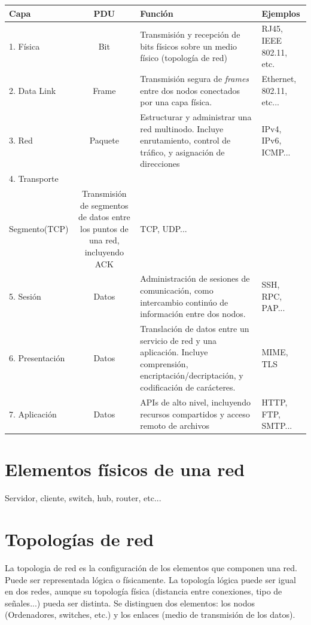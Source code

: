 \documentclass[a4paper, 11pt]{report} %
\begin{document}
\renewcommand{\arraystretch}{1.2}
\noindent
\begin{tabularx}{\columnwidth}{|l c X p{2cm}|}
	\rowcolor{header} \hline
	\textbf{Capa} & \textbf{PDU} & \textbf{Función} & \textbf{Ejemplos} \\ \hline
	1. Física & Bit & Transmisión y recepción de bits físicos sobre un medio físico (topología de red) & 	 RJ45, IEEE 802.11, etc. \\
	\label{osi}
	2. Data Link & Frame & Transmisión segura de \textit{frames} entre dos nodos conectados por una capa física. & Ethernet, 802.11, etc...\\
	3. Red & Paquete & Estructurar y administrar una red multinodo. Incluye enrutamiento, control de tráfico, y asignación de direcciones & IPv4, IPv6, ICMP... \\
	4. Transporte & \begin{tabular}[t]{@{}c@{}}Datagrama(UDP)\\Segmento(TCP)  \end{tabular} &
	Transmisión de segmentos de datos entre los puntos de una red, incluyendo ACK & TCP, UDP...\\
	5. Sesión & Datos & Administración de sesiones de comunicación, como intercambio continúo de información entre dos nodos. & SSH, RPC, PAP...\\ 
	6. Presentación & Datos & Translación de datos entre un servicio de red y una aplicación. Incluye comprensión, encriptación/decriptación, y codificación de carácteres. & MIME, TLS \\
	7. Aplicación & Datos & APIs de alto nivel, incluyendo recursos compartidos y acceso remoto de archivos & HTTP, FTP, SMTP... \\ \hline
\end{tabularx}

\section{Elementos físicos de una red}
Servidor, cliente, switch, hub, router, etc...

\section{Topologías de red}
\label{topdred}
La \gls{topologia} de red es la configuración de los elementos que componen una red. Puede ser representada lógica o físicamente. La topología lógica puede ser igual en dos redes, aunque su topología física (distancia entre conexiones, tipo de señales...) pueda ser distinta. Se distinguen dos elementos: los nodos (Ordenadores, switches, etc.) y los enlaces (medio de transmisión de los datos).
\end{document}
